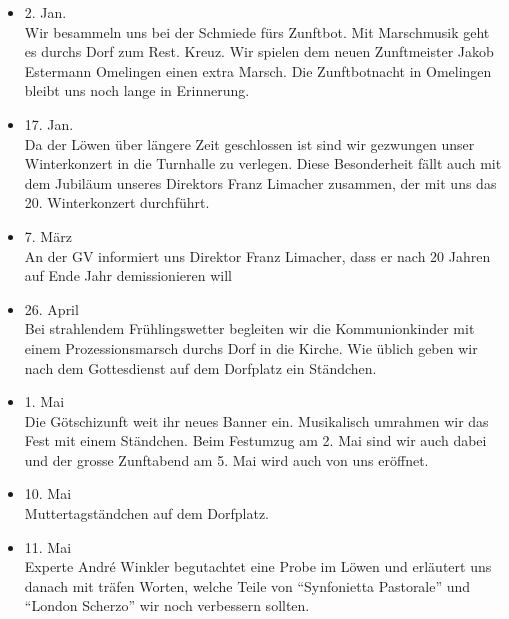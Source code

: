 \begin{history}


    \begin{itemize}

        \item[]2. Jan.\\
        Wir besammeln uns bei der Schmiede fürs Zunftbot. Mit Marschmusik geht
        es durchs Dorf zum Rest. Kreuz. Wir spielen dem neuen Zunftmeister Jakob
        Estermann Omelingen einen extra Marsch. Die Zunftbotnacht in Omelingen
        bleibt uns noch lange in Erinnerung.

        \item[]17. Jan.\\
        Da der Löwen über längere Zeit geschlossen ist sind wir gezwungen unser
        Winterkonzert in die Turnhalle zu verlegen. Diese Besonderheit fällt
        auch mit dem Jubiläum unseres Direktors Franz Limacher zusammen, der mit
        uns das 20. Winterkonzert durchführt.

        \item[]7. März\\
        An der GV informiert uns Direktor Franz Limacher, dass er nach 20 Jahren
        auf Ende Jahr demissionieren will

        \item[]26. April\\
        Bei strahlendem Frühlingswetter begleiten wir die Kommunionkinder mit
        einem Prozessionsmarsch durchs Dorf in die Kirche. Wie üblich geben wir
        nach dem Gottesdienst auf dem Dorfplatz ein Ständchen.

        \item[]1. Mai\\
        Die Götschizunft weit ihr neues Banner ein. Musikalisch umrahmen wir das
        Fest mit einem Ständchen. Beim Festumzug am 2. Mai sind wir auch dabei
        und der grosse Zunftabend am 5. Mai wird auch von uns eröffnet.

        \item[]10. Mai\\
        Muttertagständchen auf dem Dorfplatz.

        \item[]11. Mai\\
        Experte André Winkler begutachtet eine Probe im Löwen und erläutert uns
        danach mit träfen Worten, welche Teile von \enquote{Synfonietta Pastorale} und
        \enquote{London Scherzo} wir noch verbessern sollten.


\end{itemize}
\end{history}
